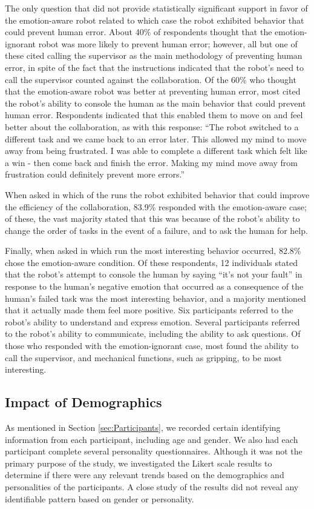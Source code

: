 \documentclass{sig-alternate-05-2015}
\begin{document}
The only question that did not provide statistically significant support in
favor of the emotion-aware robot related to which case the robot exhibited
behavior that could prevent human error. About 40\% of respondents thought that
the emotion-ignorant robot was more likely to prevent human error; however, all
but one of these cited calling the supervisor as the main methodology of
preventing human error, in spite of the fact that the instructions indicated
that the robot's need to call the supervisor counted against the collaboration.
Of the 60\% who thought that the emotion-aware robot was better at preventing
human error, most cited the robot's ability to console the human as the main
behavior that could prevent human error. Respondents indicated that this enabled
them to move on and feel better about the collaboration, as with this response:
``The robot switched to a different task and we came back to an error later.
This allowed my mind to move away from being frustrated. I was able to complete
a different task which felt like a win - then come back and finish the error.
Making my mind move away from frustration could definitely prevent more errors.''

When asked in which of the runs the robot exhibited behavior that could improve
the efficiency of the collaboration, 83.9\% responded with the emotion-aware
case; of these, the vast majority stated that this was because of the robot's
ability to change the order of tasks in the event of a failure, and to ask the
human for help.

Finally, when asked in which run the most interesting behavior occurred, 82.8\%
chose the emotion-aware condition. Of these respondents, 12 individuals stated
that the robot's attempt to console the human by saying ``it's not your fault'' in
response to the human's negative emotion that occurred as a consequence of the
human's failed task was the most interesting behavior, and a majority mentioned
that it actually made them feel more positive. Six participants referred to the
robot's ability to understand and express emotion. Several participants referred
to the robot's ability to communicate, including the ability to ask questions.
Of those who responded with the emotion-ignorant case, most found the ability to
call the supervisor, and mechanical functions, such as gripping, to be most
interesting.

\subsection{Impact of Demographics} 
As mentioned in Section \ref{sec:Participants}, we recorded certain identifying
information from each participant, including age and gender. We also had each
participant complete several personality questionnaires. Although it was not the
primary purpose of the study, we investigated the Likert scale results to
determine if there were any relevant trends based on the demographics and
personalities of the participants. A close study of the results did  not reveal
any identifiable pattern based on gender or personality.
 
\end{document}
